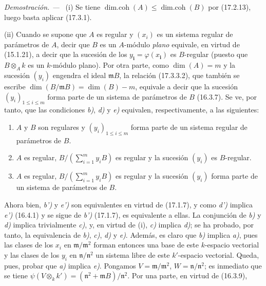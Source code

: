 \documentclass[10pt,oneside]{book}
\newcommand{\oldpage}[2][]{%
  \setcounter{footnote}{0}%
  \marginpar{\scriptsize\textbf{#1}~|~#2}\ignorespaces}
\newenvironment{proof}{%
  \par\medskip\noindent\textit{Demostración. ---\ }}{\par}
\providecommand{\setmin}{-}%
\begin{document}
\begin{proof}
\textnormal{(i)} Se tiene
$\operatorname{dim.coh}(A)\leq\operatorname{dim.coh}(B)$ por (17.2.13), luego
basta aplicar (17.3.1).

\textnormal{(ii)} Cuando se supone que $A$ es regular y $(x_i)$ es un sistema
regular de parámetros de $A$, decir que $B$ es un $A$-módulo \emph{plano}
equivale, en virtud de (15.1.21), a decir que la sucesión de los
$y_{\boldsymbol i}=\varphi(x_{\boldsymbol i})$ es $B$-regular (puesto que $B\otimes_A k$ es un
$k$-módulo plano). Por otra parte, como $\dim(A)=m$ y la sucesión $(y_i)$
engendra el ideal $\mathfrak{m}B$, la relación (17.3.3.2), que también se
escribe $\dim(B/\mathfrak{m}B)=\dim(B)\setmin m$, equivale a decir que la sucesión
$(y_i)_{1\leq i\leq m}$ forma parte de un sistema de parámetros de $B$
(16.3.7). Se ve, por tanto, que las condiciones \emph{b)}, \emph{d)} y \emph{e)} equivalen,
respectivamente, a las siguientes:
\begin{enumerate}
  \item[\textit{b')}] $A$ y $B$ son regulares y $(y_i)_{1\leq i\leq m}$ forma
  parte de un sistema regular de parámetros de $B$.
  \item[\textit{d')}] $A$ es regular,
  $B/(\sum_{i=1}^m y_iB)$ es regular y la sucesión $(y_i)$ es
  $B$-regular.
  \item[\textit{e')}] $A$ es regular,
  $B/(\sum_{i=1}^m y_iB)$ es regular y la sucesión $(y_i)$ forma parte de un
  sistema de parámetros de $B$.
\end{enumerate}
Ahora bien, \emph{b')} y \emph{e')} son equivalentes en virtud de (17.1.7), y como \emph{d')}
implica \emph{e')} (16.4.1) y se sigue de \emph{b')} (17.1.7), es equivalente a ellas.
La conjunción
\oldpage[0\textsubscript{IV-1}]{49}
de \emph{b)} y \emph{d)} implica trivialmente \emph{c)}, y, en virtud de (i), \emph{c)} implica \emph{d)}; se ha
probado, por tanto, la equivalencia de \emph{b)}, \emph{c)}, \emph{d)} y \emph{e)}. Además, es claro que
\emph{b)} implica \emph{a)}, pues las clases de los $x_i$ en
$\mathfrak{m}/\mathfrak{m}^2$ forman entonces una base de este $k$-espacio
vectorial y las clases de los $y_i$ en $\mathfrak{n}/\mathfrak{n}^2$ un
sistema libre de este $k'$-espacio vectorial. Queda, pues, probar que \emph{a)}
implica \emph{e)}. Pongamos $V=\mathfrak{m}/\mathfrak{m}^2$,
$W=\mathfrak{n}/\mathfrak{n}^2$; es inmediato que se tiene
$\psi(V\otimes_k k')=(\mathfrak{n}^2+\mathfrak{m}B)/\mathfrak{n}^2$. Por una
parte, en virtud de (16.3.9),
\begin{equation}

\end{equation}
\end{proof}
\end{document}
